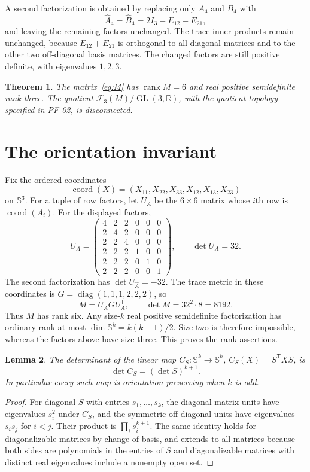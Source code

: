 \documentclass[11pt]{article}
\newtheorem{theorem}{Theorem}
\newtheorem{lemma}[theorem]{Lemma}
\newcommand{\GL}{\operatorname{GL}}
\newcommand{\rank}{\operatorname{rank}}
\begin{document}
A second factorization is obtained by replacing only $A_4$ and $B_4$ with
\[
\widehat A_4=\widehat B_4=2I_3-E_{12}-E_{21},
\]
and leaving the remaining factors unchanged. The trace inner products remain unchanged, because $E_{12}+E_{21}$ is orthogonal to all diagonal matrices and to the other two off-diagonal basis matrices. The changed factors are still positive definite, with eigenvalues $1,2,3$.

\begin{theorem}\label{thm:main}
The matrix~\eqref{eq:M} has $\rank M=6$ and real positive semidefinite rank three. The quotient $\mathcal F_3(M)/\GL(3,\mathbb R)$, with the quotient topology specified in PF-02, is disconnected.
\end{theorem}

\section{The orientation invariant}
Fix the ordered coordinates
\[
\operatorname{coord}(X)=(X_{11},X_{22},X_{33},X_{12},X_{13},X_{23})
\]
on $\mathbb S^3$. For a tuple of row factors, let $U_A$ be the $6\times6$ matrix whose $i$th row is $\operatorname{coord}(A_i)$. For the displayed factors,
\[
U_A=\begin{pmatrix}
4&2&2&0&0&0\\
2&4&2&0&0&0\\
2&2&4&0&0&0\\
2&2&2&1&0&0\\
2&2&2&0&1&0\\
2&2&2&0&0&1
\end{pmatrix},\qquad \det U_A=32.
\]
The second factorization has $\det U_{\widehat A}=-32$.
The trace metric in these coordinates is $G=\operatorname{diag}(1,1,1,2,2,2)$, so
\[
 M=U_A G U_A^{\mathsf T},\qquad \det M=32^2\cdot8=8192.
\]
Thus $M$ has rank six. Any size-$k$ real positive semidefinite factorization has ordinary rank at most $\dim\mathbb S^k=k(k+1)/2$. Size two is therefore impossible, whereas the factors above have size three. This proves the rank assertions.

\begin{lemma}\label{lem:det}
The determinant of the linear map $C_S:\mathbb S^k\to\mathbb S^k$, $C_S(X)=S^{\mathsf T}XS$, is
\[
 \det C_S=(\det S)^{k+1}.
\]
In particular every such map is orientation preserving when $k$ is odd.
\end{lemma}
\begin{proof}
For diagonal $S$ with entries $s_1,\ldots,s_k$, the diagonal matrix units have eigenvalues $s_i^2$ under $C_S$, and the symmetric off-diagonal units have eigenvalues $s_is_j$ for $i<j$. Their product is $\prod_i s_i^{k+1}$. The same identity holds for diagonalizable matrices by change of basis, and extends to all matrices because both sides are polynomials in the entries of $S$ and diagonalizable matrices with distinct real eigenvalues include a nonempty open set.
\end{proof}
\end{document}
